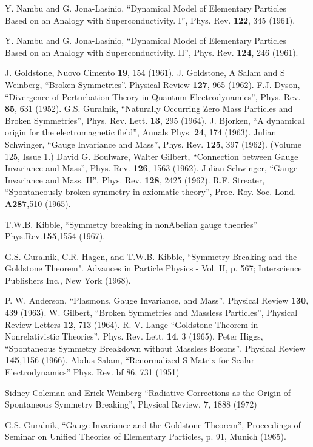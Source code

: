 \documentclass[letterpaper,twoside,preprintnumbers,slac_one]{revtex4}
\begin{document}
\begin{thebibliography}{99}
 Y. Nambu and G. Jona-Lasinio, ``Dynamical Model of
  Elementary Particles Based on an Analogy with Superconductivity. I'',
  Phys. Rev. {\bf 122}, 345 (1961).

 Y. Nambu and G. Jona-Lasinio, ``Dynamical Model of
  Elementary Particles Based on an Analogy with Superconductivity. II'',
  Phys. Rev. {\bf 124}, 246 (1961).

 J. Goldstone, Nuovo Cimento {\bf 19}, 154 (1961).
 J. Goldstone, A Salam and S Weinberg, ``Broken
  Symmetries''. Physical Review {\bf 127}, 965 (1962).
 F.J. Dyson, ``Divergence of Perturbation Theory in Quantum
  Electrodynamics'', Phys. Rev. {\bf 85}, 631 (1952).
 G.S. Guralnik, ``Naturally Occurring Zero Mass Particles and Broken
Symmetries'',  Phys. Rev. Lett. {\bf 13}, 295 (1964).
 J. Bjorken, ``A dynamical origin for the electromagnetic field'',
  Annals Phys. {\bf 24}, 174 (1963).
 Julian Schwinger, ``Gauge Invariance and Mass'',
  Phys. Rev. {\bf 125}, 397 (1962). (Volume 125, Issue 1.)
 David G. Boulware, Walter Gilbert, ``Connection between Gauge
  Invariance and Mass'', Phys. Rev. {\bf 126}, 1563 (1962).
 Julian Schwinger, ``Gauge Invariance and Mass. II'',
  Phys. Rev. {\bf 128}, 2425 (1962).
 R.F. Streater, ``Spontaneously broken symmetry in axiomatic
  theory'', Proc. Roy. Soc. Lond. {\bf A287},510 (1965).

 T.W.B. Kibble, ``Symmetry breaking in nonAbelian gauge theories''
Phys.Rev.{\bf155},1554 (1967).

 G.S. Guralnik, C.R. Hagen, and T.W.B. Kibble, ``Symmetry
  Breaking and the Goldstone Theorem".
  {Advances in Particle Physics - Vol. II}, p. 567; Interscience
  Publishers Inc., New York (1968).

 P. W. Anderson, ``Plasmons, Gauge Invariance, and Mass'',
  Physical Review {\bf 130}, 439 (1963).
 W. Gilbert, ``Broken Symmetries and Massless Particles'',
  Physical Review Letters {\bf 12}, 713 (1964).
 R. V. Lange ``Goldstone Theorem in Nonrelativistic
  Theories'', Phys. Rev. Lett. {\bf 14}, 3 (1965).
 Peter Higgs, ``Spontaneous Symmetry Breakdown without
  Massless Bosons'', Physical Review {\bf  145},1156 (1966).
 Abdus Salam, ``Renormalized S-Matrix for Scalar Electrodynamics'' Phys. Rev. {bf 86}, 731 (1951)

 Sidney Coleman and Erick Weinberg ``Radiative
  Corrections as the Origin of Spontaneous Symmetry Breaking'',
  Physical Review. {\bf 7}, 1888 (1972)

 G.S. Guralnik, ``Gauge Invariance and the Goldstone Theorem'',
  Proceedings of Seminar on Unified Theories of Elementary Particles, p. 91,
  Munich (1965).




\end{thebibliography}
\end{document}
